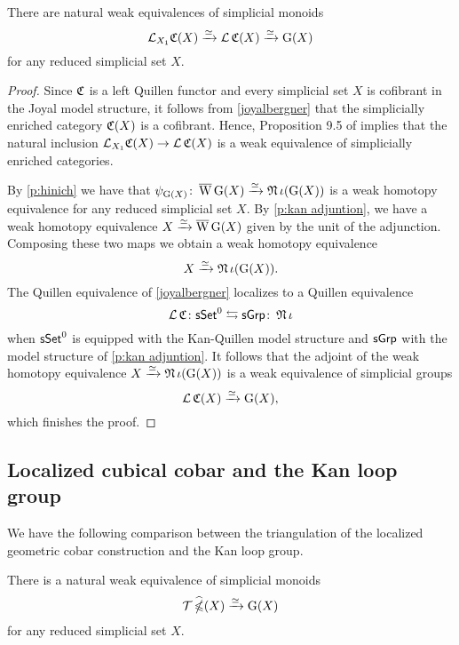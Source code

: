\begin{lemma} \label{CandG}
	There are natural weak equivalences of simplicial monoids
	\[
	\operatorname{\mathcal{L}}_{X_1} \! \operatorname{\mathfrak{C}}(X) \xrightarrow{\simeq} \operatorname{\mathcal{L}} \operatorname{\mathfrak{C}}(X) \xrightarrow{\simeq} \operatorname{G}(X)
	\]
	for any reduced simplicial set $X$.
\end{lemma}

\begin{proof}
	Since $\operatorname{\mathfrak{C}}$ is a left Quillen functor and every simplicial set $X$ is cofibrant in the Joyal model structure, it follows from \cref{joyalbergner} that the simplicially enriched category $\operatorname{\mathfrak{C}}(X)$ is a cofibrant.
	Hence, Proposition 9.5 of \cite{dwyer1980simplicial} implies that the natural inclusion $\operatorname{\mathcal{L}}_{X_1} \! \operatorname{\mathfrak{C}}(X) \to \operatorname{\mathcal{L}} \operatorname{\mathfrak{C}}(X)$ is a weak equivalence of simplicially enriched categories.

	By \cref{p:hinich} we have that $\psi_{\operatorname{G}(X)} \colon \operatorname{\overline{W}} \operatorname{G}(X) \xrightarrow{\simeq} \operatorname{\mathfrak{N}} \iota(\operatorname{G}(X))$ is a weak homotopy equivalence for any reduced simplicial set $X$.
	By \cref{p:kan adjuntion}, we have a weak homotopy equivalence $X \xrightarrow{\simeq} \operatorname{\overline{W}} \operatorname{G}(X)$ given by the unit of the adjunction.
	Composing these two maps we obtain a weak homotopy equivalence
	\[
	X \xrightarrow{\simeq} \operatorname{\mathfrak{N}}\iota(\operatorname{G}(X)).
	\]
	The Quillen equivalence of \cref{joyalbergner} localizes to a Quillen equivalence
	\[
	\operatorname{\mathcal{L}} \operatorname{\mathfrak{C}} \colon \mathsf{sSet}^0 \leftrightarrows \mathsf{sGrp} \colon \operatorname{\mathfrak{N}} \iota
	\]
	when $\mathsf{sSet}^0$ is equipped with the Kan-Quillen model structure and $\mathsf{sGrp}$ with the model structure of \cref{p:kan adjuntion}.
	It follows that the adjoint of the weak homotopy equivalence $X \xrightarrow{\simeq} \operatorname{\mathfrak{N}} \iota(\operatorname{G}(X))$ is a weak equivalence of simplicial groups
	\[
	\operatorname{\mathcal{L}} \operatorname{\mathfrak{C}}(X) \xrightarrow{\simeq} \operatorname{G}(X),
	\]
	which finishes the proof.
\end{proof}


\subsection{Localized cubical cobar and the Kan loop group}

We have the following comparison between the triangulation of the localized geometric cobar construction and the Kan loop group.

\begin{corollary} \label{widehatgcobarandG}
	There is a natural weak equivalence of simplicial monoids
	\[
	\mathcal{T} \operatorname{\widehat{\mathbb{\Omega}}}(X) \xrightarrow{\simeq} \operatorname{G}(X)
	\]
	for any reduced simplicial set $X$.
\end{corollary}

